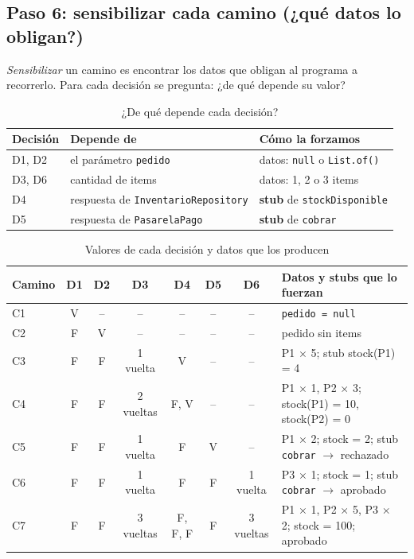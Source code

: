 \documentclass[11pt,a4paper,oneside]{report}
\newcommand{\code}[1]{\texttt{#1}}
\begin{document}
\subsection{Paso 6: sensibilizar cada camino (¿qué datos lo obligan?)}
\emph{Sensibilizar} un camino es encontrar los datos que obligan al programa a recorrerlo. Para cada decisión se pregunta: ¿de qué depende su valor?

\begin{table}[H]
\centering
\caption{¿De qué depende cada decisión?}
\small
\begin{tabularx}{\linewidth}{llX}
\toprule
\textbf{Decisión} & \textbf{Depende de} & \textbf{Cómo la forzamos}\\
\midrule
D1, D2 & el parámetro \code{pedido} & datos: \code{null} o \code{List.of()}\\
D3, D6 & cantidad de items & datos: 1, 2 o 3 items\\
D4 & respuesta de \code{InventarioRepository} & \textbf{stub} de \code{stockDisponible}\\
D5 & respuesta de \code{PasarelaPago} & \textbf{stub} de \code{cobrar}\\
\bottomrule
\end{tabularx}
\end{table}

\begin{table}[H]
\centering
\caption{Valores de cada decisión y datos que los producen}
\scriptsize
\setlength{\tabcolsep}{3pt}
\begin{tabularx}{\linewidth}{lcccccc X}
\toprule
\textbf{Camino} & \textbf{D1} & \textbf{D2} & \textbf{D3} & \textbf{D4} & \textbf{D5} & \textbf{D6} & \textbf{Datos y stubs que lo fuerzan}\\
\midrule
C1 & V & -- & -- & -- & -- & -- & \code{pedido = null}\\
C2 & F & V & -- & -- & -- & -- & pedido sin items\\
C3 & F & F & 1 vuelta & V & -- & -- & P1 $\times$ 5; stub stock(P1) = 4\\
C4 & F & F & 2 vueltas & F, V & -- & -- & P1 $\times$ 1, P2 $\times$ 3; stock(P1) = 10, stock(P2) = 0\\
C5 & F & F & 1 vuelta & F & V & -- & P1 $\times$ 2; stock = 2; stub \code{cobrar} $\rightarrow$ rechazado\\
C6 & F & F & 1 vuelta & F & F & 1 vuelta & P3 $\times$ 1; stock = 1; stub \code{cobrar} $\rightarrow$ aprobado\\
C7 & F & F & 3 vueltas & F, F, F & F & 3 vueltas & P1 $\times$ 1, P2 $\times$ 5, P3 $\times$ 2; stock = 100; aprobado\\
\bottomrule
\end{tabularx}
\end{table}
\end{document}
